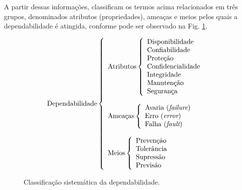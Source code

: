A partir dessas informações,  classificam os termos
acima relacionados em três grupos, denominados atributos (propriedades), ameaças
e meios pelos quais a dependabilidade é atingida, conforme pode ser observado
na Fig. \ref{fig:div_avizienis}.

\begin{figure}[htb]
\centering
\footnotesize
\[
\text{Dependabilidade}
\left\{
\begin{array}{l}
\text{Atributos}
    \left\{
    \begin{array}{l}
        \text{Disponibilidade}\\
        \text{Confiabilidade}\\
        \text{Proteção}\\
        \text{Confidencialidade}\\
        \text{Integridade}\\
        \text{Manutenção}\\
        \text{Segurança}
    \end{array}
    \right.
\\
\\
\text{Ameaças}
    \left\{
    \begin{array}{l}
        \text{Avaria ({\it failure})}\\
        \text{Erro ({\it error})}\\
        \text{Falha ({\it fault})}
    \end{array}
    \right.
\\
\\
\text{Meios}
    \left\{
    \begin{array}{l}
        \text{Prevenção}\\
        \text{Tolerância}\\
        \text{Supressão}\\
        \text{Previsão}
    \end{array}
    \right.
\end{array}
\right.
\]
\caption{Classificação sistemática da dependabilidade.}
\label{fig:div_avizienis}
\end{figure}

